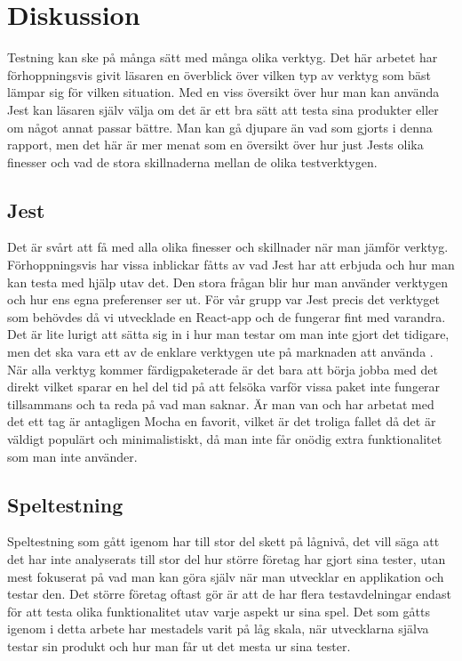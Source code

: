 \section{Diskussion}
\label{sec:david-discussion}
Testning kan ske på många sätt med många olika verktyg. Det här arbetet har förhoppningsvis givit läsaren en överblick över vilken typ av verktyg som bäst lämpar sig för vilken situation. Med en viss översikt över hur man kan använda Jest kan läsaren själv välja om det är ett bra sätt att testa sina produkter eller om något annat passar bättre. Man kan gå djupare än vad som gjorts i denna rapport, men det här är mer menat som en översikt över hur just Jests olika finesser och vad de stora skillnaderna mellan de olika testverktygen.

\subsection{Jest} 
\label{subsec:david-discussion-jest}
Det är svårt att få med alla olika finesser och skillnader när man jämför verktyg. Förhoppningsvis har vissa inblickar fåtts av vad Jest har att erbjuda och hur man kan testa med hjälp utav det. Den stora frågan blir hur man använder verktygen och hur ens egna preferenser ser ut. För vår grupp var Jest precis det verktyget som behövdes då vi utvecklade en React-app och de fungerar fint med varandra. Det är lite lurigt att sätta sig in i hur man testar om man inte gjort det tidigare, men det ska vara ett av de enklare verktygen ute på marknaden att använda \cite{bib-jest-easy}. När alla verktyg kommer färdigpaketerade är det bara att börja jobba med det direkt vilket sparar en hel del tid på att felsöka varför vissa paket inte fungerar tillsammans och ta reda på vad man saknar. Är man van och har arbetat med det ett tag är antagligen Mocha en favorit, vilket är det troliga fallet då det är väldigt populärt och minimalistiskt, då man inte får onödig extra funktionalitet som man inte använder. 

\subsection{Speltestning}
\label{subsec:david-discussion-speltestning}
Speltestning som gått igenom har till stor del skett på lågnivå, det vill säga att det har inte analyserats till stor del hur större företag har gjort sina tester, utan mest fokuserat på vad man kan göra själv när man utvecklar en applikation och testar den. Det större företag oftast gör är att de har flera testavdelningar endast för att testa olika funktionalitet utav varje aspekt ur sina spel. Det som gåtts igenom i detta arbete har mestadels varit på låg skala, när utvecklarna själva testar sin produkt och hur man får ut det mesta ur sina tester. 